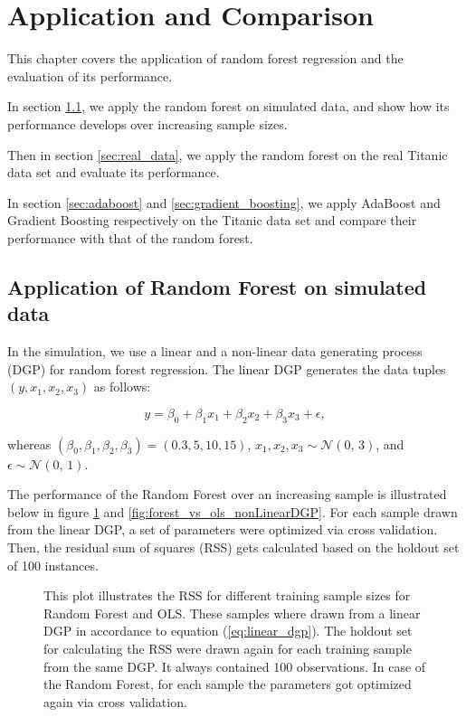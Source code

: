 \section{Application and Comparison}
This chapter covers the application of random forest regression and the evaluation of its performance.

In section \ref{sec:simulation}, we apply the random forest on simulated data, 
and show how its performance develops over increasing sample sizes.

Then in section \ref{sec:real_data}, we apply the random forest on the real Titanic data set \cite{titanicData}
and evaluate its performance.

In section \ref{sec:adaboost} and \ref{sec:gradient_boosting}, we apply AdaBoost and Gradient
Boosting respectively on the Titanic data set and  compare their performance with that of the random forest.

\subsection{Application of Random Forest on simulated data}
\label{sec:simulation}

In the simulation, we use a linear and a non-linear data generating process (DGP) for random forest regression.
The linear DGP generates the data tuples \( (y, x_{1}, x_{2}, x_{3}) \) as follows:

\begin{equation}\label{eq:linear_dgp}
    y = \beta_{0} + \beta_{1} x_{1} + \beta_{2} x_{2} + \beta_{3} x_{3} + \epsilon,
\end{equation}

whereas \( (\beta_{0}, \beta_{1}, \beta_{2}, \beta_{3}) = (0.3, 5, 10, 15) \),
\( x_{1}, x_{2}, x_{3} \sim \mathcal{N}(0,\,3) \), and \( \epsilon \sim \mathcal{N}(0,\,1) \).

The performance of the Random Forest over an increasing sample is illustrated
below in figure \ref{fig:forest_vs_ols_linearDGP} and \ref{fig:forest_vs_ols_nonLinearDGP}.
For each sample drawn from the linear DGP, a set of parameters
were optimized via cross validation. Then, the residual sum of squares (RSS) gets calculated
based on the holdout set of 100 instances.

\begin{figure}
    \captionsetup{format=plain}
    \caption
        {This plot illustrates the RSS for different training sample sizes for Random Forest and OLS.
        These samples where drawn from a linear DGP in accordance to equation (\ref{eq:linear_dgp}).
        The holdout set for calculating the RSS were drawn again for each training sample from the same DGP.
        It always contained 100 observations. In case of the Random Forest, for each sample the parameters
        got optimized again via cross validation.
        }
    \label{fig:forest_vs_ols_linearDGP}
\end{figure}

